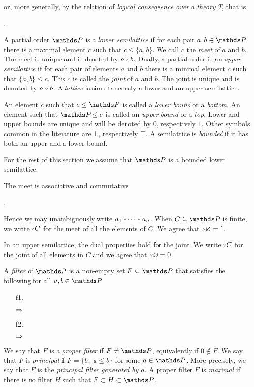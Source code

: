 \documentclass[creche.tex]{subfiles}
\begin{document}
or, more generally, by the relation of \emph{logical consequence over a theory $T$}, that is

.

A partial order $\PP$ is a \emph{lower semilattice\/} if for each pair $a,b\in\PP$ there is a maximal element $c$ such that $c\le\{a,b\}$. We call $c$ the \emph{meet\/} of $a$ and $b$. The meet is unique and is denoted by \emph{$a\swedge b$}. Dually, a partial order is an \emph{upper semilattice\/} if for each pair of elements $a$ and $b$ there is a minimal element $c$ such that $\{a,b\}\le c$. This $c$ is called the \emph{joint\/} of $a$ and $b$. The joint is unique and is denoted by \emph{$a\svee b$}. A \emph{lattice\/} is simultaneously a lower and an upper semilattice.

An element $c$ such that $c\le \PP$ is called a \emph{lower bound\/} or a \emph{bottom}. An element such that $\PP\le c$ is called an \emph{upper bound\/} or a \emph{top}. Lower and upper bounds are unique and will be denoted by \emph{$0$}, respectively \emph{$1$}. Other symbols common in the literature are \emph{$\bot$}, respectively \emph{$\top$}. A semilattice is \emph{bounded\/} if it has both an upper and a lower bound.

For the rest of this section we assume that $\PP$ is a bounded lower semilattice.

The meet is associative and commutative


.

Hence we may unambiguously write  $a_1\swedge\dots\swedge a_n$. When $C\subseteq\PP$ is finite, we write \emph{$\swedge C$} for the meet of all the elements of $C$. We agree that $\swedge\0=1$.

In an upper semilattice, the dual properties hold for the joint. We write \emph{$\svee C$} for the joint of all elements in $C$ and we agree that  $\svee\0=0$.

A \emph{filter\/} of $\PP$ is a non-empty set $F\subseteq \PP$ that satisfies the following for all $a,b\in \PP$
\begin{itemize}
\def\ceq#1#2#3{\hspace*{16ex}\llap{$#1$}\parbox{5ex}{\hfil$#2$}\rlap{$#3$}}
\item[f1.] \ceq{a\in F\ \textrm{ and }\ a\le b}{\IMP}{b\in F}
\item[f2.] \ceq{a, b\in F}{\IMP}{a\swedge  b\in F.}
\end{itemize}
We say that $F$ is a \emph{proper filter\/} if $F\neq \PP$, equivalently if $0\notin F$. We say that $F$ is \emph{principal\/} if $F=\big\{b\ :\ a\le b\big\}$ for some $a\in \PP$. More precisely, we say that $F$ is the \emph{principal filter generated by $a$}. A proper filter $F$ is \emph{maximal\/} if there is no filter $H$ such that $F\subset H\subset \PP$.
\end{document}
